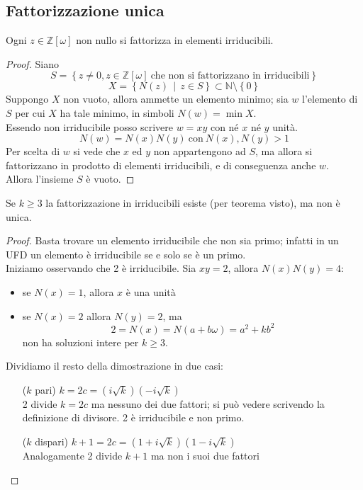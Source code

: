 \subsection{Fattorizzazione unica}
\begin{teorema}
	Ogni $z\in\mathbb{Z}[\omega]$ non nullo si fattorizza in elementi irriducibili.
\end{teorema}
\begin{proof}
	Siano
	\begin{equation*}
		S=\left\{z\neq0, z \in \mathbb{Z}[\omega] \ \text{che non si fattorizzano in irriducibili}\right\}
	\end{equation*}
	\begin{equation*}
		X=\left\{N(z) \, \mid \, z \in S\right\}\subset\mathbb{N}\setminus\left\{0\right\}
	\end{equation*}
	Suppongo $X$ non vuoto, allora ammette un elemento minimo; sia $w$ l'elemento di $S$ per cui $X$ ha tale minimo, in simboli $N(w)=\min X$. \\ Essendo non irriducibile posso scrivere $w=xy$ con né $x$ né $y$ unità.
	\begin{equation*}
	N(w)=N(x)N(y) \ \text{con} \ N(x),N(y)>1 
	\end{equation*}
	Per scelta di $w$ si vede che $x$ ed $y$ non appartengono ad $S$, ma allora si fattorizzano in prodotto di elementi irriducibili, e di conseguenza anche $w$. \\ Allora l'insieme $S$ è vuoto.
\end{proof}
\begin{proposizione}
	Se $k\geq3$ la fattorizzazione in irriducibili esiste (per teorema visto), ma non è unica.
\end{proposizione}
\begin{proof}
	Basta trovare un elemento irriducibile che non sia primo; infatti in un UFD un elemento è irriducibile se e solo se è un primo. \\
	Iniziamo osservando che 2 è irriducibile. Sia $xy=2$, allora $N(x)N(y)=4$: 
	\begin{itemize}
		\item se $N(x)=1$, allora $x$ è una unità
		\item se $N(x)=2$ allora $N(y)=2$, ma 
		\begin{equation*}
		2=N(x)=N(a+b\omega)=a^2+kb^2
		\end{equation*}
		non ha soluzioni intere per $k\geq 3$.
	\end{itemize}
	Dividiamo il resto della dimostrazione in due casi:
	\begin{itemize}
		\item[($k$ pari)] $k=2c=(i\sqrt{k})(-i\sqrt{k})$\\ 2 divide $k=2c$ ma nessuno dei due fattori; si può vedere scrivendo la definizione di divisore. 2 è irriducibile e non primo.
		\item[($k$ dispari)] $k+1=2c=(1+i\sqrt{k})(1-i\sqrt{k})$\\ Analogamente 2 divide $k+1$ ma non i suoi due fattori
	\end{itemize}
\end{proof}
